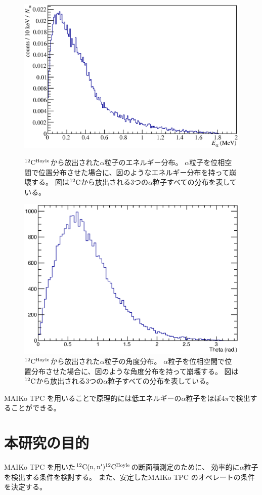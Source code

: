 \begin{figure}
  \centering
  \includegraphics[clip, width=0.7\columnwidth]{eps/alpha_e_dist_sim.eps}
  \caption[${}^{12}{\rm C}^{\rm Hoyle}$から放出された$\alpha$粒子のエネルギー分布。]
          {${}^{12}{\rm C}^{\rm Hoyle}$から放出された$\alpha$粒子のエネルギー分布。
          $\alpha$粒子を位相空間で位置分布させた場合に、図のようなエネルギー分布を持って崩壊する。
            図は${}^{12}{\rm C}$から放出される3つの$\alpha$粒子すべての分布を表している。}
  \label{fig::alpha_E_dist}
  \includegraphics[clip, width=0.7\columnwidth]{eps/alpha_theta_dist.eps}
  \caption[${}^{12}{\rm C}^{\rm Hoyle}$から放出された$\alpha$粒子の角度分布。]
          {${}^{12}{\rm C}^{\rm Hoyle}$から放出された$\alpha$粒子の角度分布。
            $\alpha$粒子を位相空間で位置分布させた場合に、図のような角度分布を持って崩壊する。
            図は${}^{12}{\rm C}$から放出される3つの$\alpha$粒子すべての分布を表している。
          }
  \label{fig::alpha_theta_dist}
\end{figure}
MAIKo TPC を用いることで原理的には低エネルギーの$\alpha$粒子をほぼ4$\pi$で検出することができる。


\section{本研究の目的}
MAIKo TPC を用いた${}^{12}{\rm C}({\rm n},{\rm n}'){}^{12}{\rm C}^{\rm Hoyle}$の断面積測定のために、
効率的に$\alpha$粒子を検出する条件を検討する。
また、安定したMAIKo TPC のオペレートの条件を決定する。
